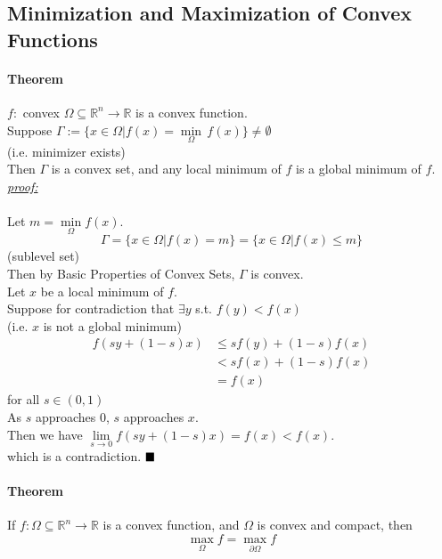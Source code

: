\documentclass[11pt]{article}
\newcommand{\real}[0]{\mathbb{R}}
\newcommand{\proof}[0]{\textit{\underline{proof:} }}
\newcommand{\qed}[0]{$\hfill\blacksquare$}
\begin{document}
\subsection{Minimization and Maximization of Convex Functions}
\paragraph{Theorem}
$f:$ convex $\Omega \subseteq \real^n \rightarrow \real$ is a convex function. \\
Suppose $\Gamma := \{ x \in \Omega | f(x) = \underset{\Omega}{\min} \, f(x)\} \neq \emptyset$\\
(i.e. minimizer exists) \\
Then $\Gamma$ is a convex set, and any local minimum of $f$ is a global minimum of $f$. \\
\proof \\\\
Let $m = \underset{\Omega}{\min} f(x)$.
$$\Gamma = \{ x \in \Omega | f(x) = m\} = \{ x \in \Omega | f(x) \leq m \}$$
(sublevel set) \\
Then by Basic Properties of Convex Sets, $\Gamma$ is convex. \\
Let $x$ be a local minimum of $f$.\\
Suppose for contradiction that $\exists y$ s.t. $f(y) < f(x)$ \\
(i.e. $x$ is not a global minimum)
\begin{align*}
	f(sy + (1-s)x) &\leq sf(y) + (1-s)f(x) \\
	&< sf(x) + (1-s)f(x) \tag{$f(y) < f(x)$}\\
	&= f(x)
\end{align*}
for all $s \in (0,1)$ \\
As $s$ approaches 0, $s$ approaches $x$. \\
Then we have
$\underset{s \rightarrow 0}{\lim} f(sy + (1-s)x) = f(x) < f(x)$.\\
which is a contradiction. \qed


\paragraph{Theorem}
If $f: \Omega \subseteq \real^n \rightarrow \real$ is a convex function, and $\Omega$ is convex and compact, then $$\underset{\Omega}{\max} f = \underset{\partial \Omega}{\max} f$$
\end{document}
